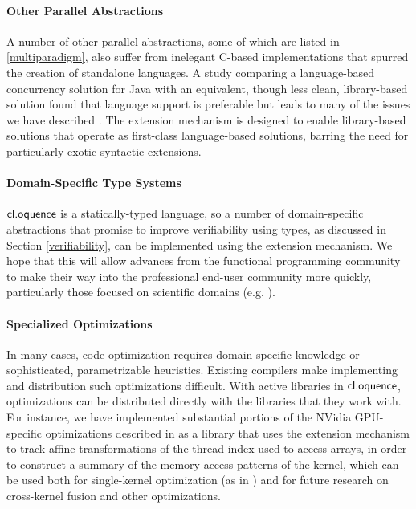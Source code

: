 \documentclass{llncs}
\begin{document}
\paragraph{Other Parallel Abstractions}
A number of other parallel abstractions, some of which are listed in \ref{multiparadigm}, also suffer from inelegant C-based implementations that spurred the creation of standalone languages. A study comparing a language-based concurrency solution for Java with an equivalent, though less clean, library-based solution found that language support is preferable but leads to many of the issues we have described \cite{cave2010comparing}. The extension mechanism is designed to enable library-based solutions that operate as first-class language-based solutions, barring the need for particularly exotic syntactic extensions.

\paragraph{Domain-Specific Type Systems}
$\textsf{cl.oquence}$ is a statically-typed language, so a number of domain-specific abstractions that promise to improve verifiability using types, as discussed in Section \ref{verifiability}, can be implemented using the extension mechanism. We hope that this will allow advances from the functional programming community to make their way into the professional end-user community more quickly, particularly those focused on scientific domains (e.g. \cite{conf/cefp/Kennedy09}).

\paragraph{Specialized Optimizations}
In many cases, code optimization requires domain-specific knowledge or sophisticated, parametrizable heuristics. Existing compilers make implementing and distribution such optimizations difficult. With active libraries in $\textsf{cl.oquence}$, optimizations can be distributed directly with the libraries that they work with. For instance, we have implemented substantial portions of the NVidia GPU-specific optimizations described in \cite{yang2010gpgpu} as a library that uses the extension mechanism to track affine transformations of the thread index used to access arrays, in order to construct a summary of the memory access patterns of the kernel, which can be used both for single-kernel optimization (as in \cite{yang2010gpgpu}) and for future research on cross-kernel fusion and other optimizations.
\end{document}
